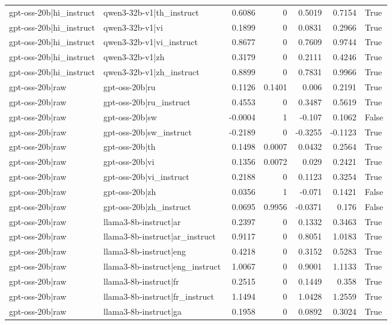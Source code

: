 \begin{table}
\begin{tabular}{l l r r r r l}
gpt-oss-20b|hi_instruct & qwen3-32b-v1|th_instruct & 0.6086 & 0 & 0.5019 & 0.7154 & True \\
gpt-oss-20b|hi_instruct & qwen3-32b-v1|vi & 0.1899 & 0 & 0.0831 & 0.2966 & True \\
gpt-oss-20b|hi_instruct & qwen3-32b-v1|vi_instruct & 0.8677 & 0 & 0.7609 & 0.9744 & True \\
gpt-oss-20b|hi_instruct & qwen3-32b-v1|zh & 0.3179 & 0 & 0.2111 & 0.4246 & True \\
gpt-oss-20b|hi_instruct & qwen3-32b-v1|zh_instruct & 0.8899 & 0 & 0.7831 & 0.9966 & True \\
gpt-oss-20b|raw & gpt-oss-20b|ru & 0.1126 & 0.1401 & 0.006 & 0.2191 & True \\
gpt-oss-20b|raw & gpt-oss-20b|ru_instruct & 0.4553 & 0 & 0.3487 & 0.5619 & True \\
gpt-oss-20b|raw & gpt-oss-20b|sw & -0.0004 & 1 & -0.107 & 0.1062 & False \\
gpt-oss-20b|raw & gpt-oss-20b|sw_instruct & -0.2189 & 0 & -0.3255 & -0.1123 & True \\
gpt-oss-20b|raw & gpt-oss-20b|th & 0.1498 & 0.0007 & 0.0432 & 0.2564 & True \\
gpt-oss-20b|raw & gpt-oss-20b|vi & 0.1356 & 0.0072 & 0.029 & 0.2421 & True \\
gpt-oss-20b|raw & gpt-oss-20b|vi_instruct & 0.2188 & 0 & 0.1123 & 0.3254 & True \\
gpt-oss-20b|raw & gpt-oss-20b|zh & 0.0356 & 1 & -0.071 & 0.1421 & False \\
gpt-oss-20b|raw & gpt-oss-20b|zh_instruct & 0.0695 & 0.9956 & -0.0371 & 0.176 & False \\
gpt-oss-20b|raw & llama3-8b-instruct|ar & 0.2397 & 0 & 0.1332 & 0.3463 & True \\
gpt-oss-20b|raw & llama3-8b-instruct|ar_instruct & 0.9117 & 0 & 0.8051 & 1.0183 & True \\
gpt-oss-20b|raw & llama3-8b-instruct|eng & 0.4218 & 0 & 0.3152 & 0.5283 & True \\
gpt-oss-20b|raw & llama3-8b-instruct|eng_instruct & 1.0067 & 0 & 0.9001 & 1.1133 & True \\
gpt-oss-20b|raw & llama3-8b-instruct|fr & 0.2515 & 0 & 0.1449 & 0.358 & True \\
gpt-oss-20b|raw & llama3-8b-instruct|fr_instruct & 1.1494 & 0 & 1.0428 & 1.2559 & True \\
gpt-oss-20b|raw & llama3-8b-instruct|ga & 0.1958 & 0 & 0.0892 & 0.3024 & True \\

\end{tabular}
\end{table}

